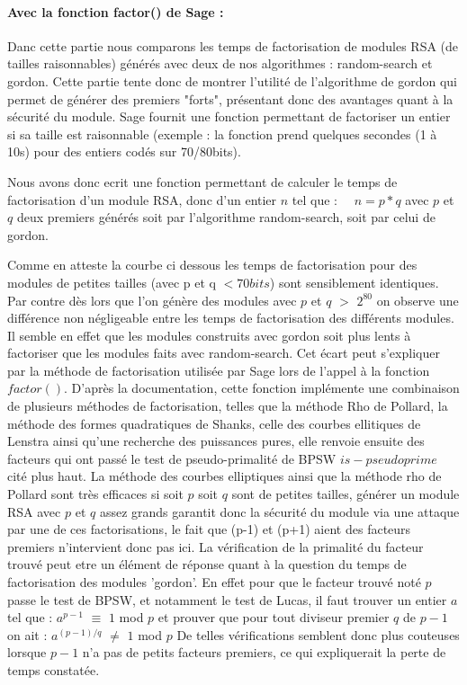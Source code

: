 \documentclass[a4paper,11pt]{article}
\begin{document}
\paragraph{ Avec la fonction factor() de Sage : } \newline \medbreak
Danc cette partie nous comparons les temps de factorisation de modules RSA (de tailles raisonnables) générés avec deux de nos algorithmes : random-search et gordon. Cette partie tente donc de montrer l'utilité de l'algorithme de gordon qui permet de générer des premiers "forts", présentant donc des avantages quant à la sécurité du module.
Sage fournit une fonction permettant de factoriser un entier si sa taille est raisonnable (exemple : la fonction prend quelques secondes (1 à 10s) pour des entiers codés sur 70/80bits). 
\par Nous avons donc ecrit une fonction permettant de calculer le temps de factorisation d'un module RSA, donc d'un entier $n$ tel que : \
\ $n = p * q$ 
\newline avec $p$ et $q$ deux premiers générés soit par l'algorithme random-search, soit par celui de gordon.

Comme en atteste la courbe ci dessous les temps de factorisation pour des modules de petites tailles (avec p et q $ < 70 bits$) sont sensiblement identiques. Par contre dès lors que l'on génère des modules avec $p$ et $q$  $>$ $2^{80}$ on observe une différence non négligeable entre les temps de factorisation des différents modules. Il semble en effet que les modules construits avec gordon soit plus lents à factoriser que les modules faits avec random-search. Cet écart peut s'expliquer par la méthode de factorisation utilisée par Sage lors de l'appel à la fonction $factor()$. D'après la documentation, cette fonction implémente une combinaison de plusieurs méthodes de factorisation, telles que la méthode Rho de Pollard, la méthode des formes quadratiques de Shanks, celle des courbes ellitiques de Lenstra ainsi qu'une recherche des puissances pures, elle renvoie ensuite des facteurs qui ont passé le test de pseudo-primalité de BPSW $is-pseudoprime$ cité plus haut. La méthode des courbes elliptiques ainsi que la méthode rho de Pollard sont très efficaces si soit $p$ soit $q$ sont de petites tailles, générer un module RSA avec $p$ et $q$ assez grands garantit donc la sécurité du module via une attaque par une de ces factorisations, le fait que (p-1) et (p+1) aient des facteurs premiers n'intervient donc pas ici. La vérification de la primalité du facteur trouvé peut etre un élément de réponse quant à la question du temps de factorisation des modules 'gordon'. En effet pour que le facteur trouvé noté $p$ passe le test de BPSW, et notamment le test de Lucas, il faut trouver un entier $a$ tel que : \newline \smallbreak
$a^{p-1} $ $\equiv$ $ 1$ mod $p $ \newline
et prouver que pour tout diviseur premier $q$ de $p-1$ on ait :  \newline \smallbreak
$ a^{(p-1)/q} $ $\ne$ $1$ mod $p$ \newline
De telles vérifications semblent donc plus couteuses lorsque $p-1$ n'a pas de petits facteurs premiers, ce qui expliquerait la perte de temps constatée.
\end{document}

